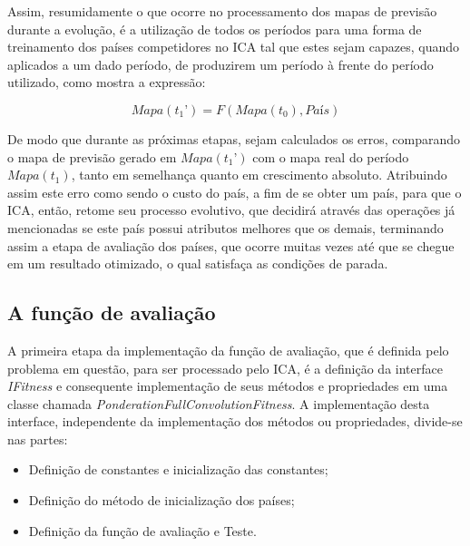Assim, resumidamente o que ocorre no processamento dos mapas de previsão durante a evolução, é a utilização de todos os períodos para uma forma de treinamento dos países competidores no ICA tal que estes sejam capazes, quando aplicados a um dado período, de produzirem um período à frente do período utilizado, como mostra a expressão:

\begin{equation}
\label{eq:forecastError}
Mapa(t_1’) = F(Mapa(t_0), País)
\end{equation}

De modo que durante as próximas etapas, sejam calculados os erros, comparando o mapa de previsão gerado em \(Mapa(t_1’)\) com o mapa real do período \(Mapa(t_1)\), tanto em semelhança quanto em crescimento absoluto. Atribuindo assim este erro como sendo o custo do país, a fim de se obter um país, para que o ICA, então, retome seu processo evolutivo, que decidirá através das operações já mencionadas se este país possui atributos melhores que os demais, terminando assim a etapa de avaliação dos países, que ocorre muitas vezes até que se chegue em um resultado otimizado, o qual satisfaça as condições de parada.




\subsection{A função de avaliação}

A primeira etapa da implementação da função de avaliação, que é definida pelo problema em questão, para ser processado pelo ICA, é a definição da interface \emph{IFitness} e consequente implementação de seus métodos e propriedades em uma classe chamada \emph{PonderationFullConvolutionFitness}. A implementação desta interface, independente da implementação dos métodos ou propriedades, divide-se nas partes: 
\begin{itemize}
\item Definição de constantes e inicialização das constantes;
\item Definição do método de inicialização dos países;
\item Definição da função de avaliação e
Teste.
\end{itemize}

